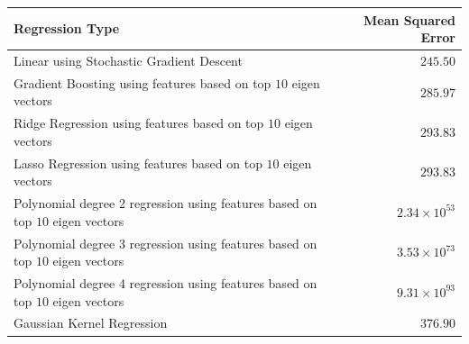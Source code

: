 \documentclass[landscape,a0paper,fontscale=0.285]{baposter} %
\begin{document}
\begin{poster}
{\begin{center}
    \begin{tabular}{|l|r|}
      \hline
   Regression Type  & Mean Squared Error \\
      \hline      
      Linear using Stochastic Gradient Descent&   $245.50$ \\
      \hline      
      Gradient Boosting using features based on top $10$ eigen vectors &    $285.97$    \\
      \hline
      Ridge Regression using features based on top $10$ eigen vectors&    $293.83$    \\
      \hline
      Lasso Regression using features based on top $10$ eigen vectors&    $293.83$    \\
      \hline
     Polynomial degree 2 regression using features based on top $10$ eigen vectors &    $2.34\times10^{53}$    \\
      \hline
     Polynomial degree 3 regression using features based on top $10$ eigen vectors &    $3.53\times10^{73}$    \\
      \hline
     Polynomial degree 4 regression using features based on top $10$ eigen vectors &    $9.31\times10^{93}$    \\
      \hline
      Gaussian Kernel Regression &    $376.90$    \\
      \hline
    \end{tabular}
    \end{center}
}

\end{poster}
\end{document}
